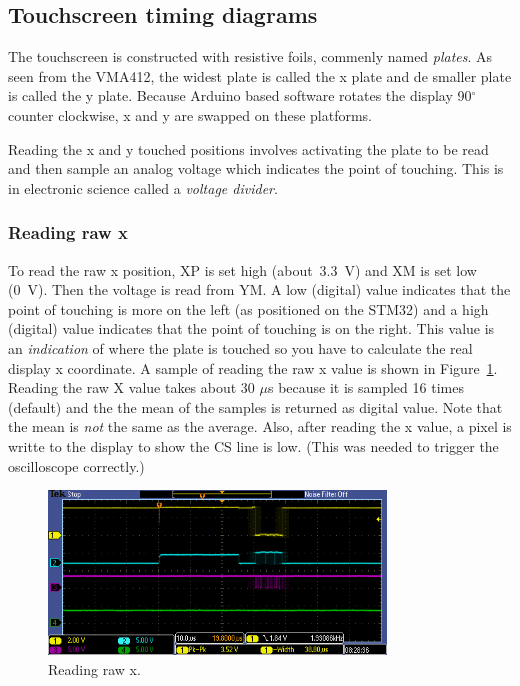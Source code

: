 \documentclass[12pt]{article}
\begin{document}
\subsection{Touchscreen timing diagrams}
The touchscreen is constructed with resistive foils, commenly named \textsl{plates}. As seen from the VMA412, the widest plate is called the x plate and de smaller plate is called the y plate. Because Arduino based software rotates the display 90$^\circ$ counter clockwise, x and y are swapped on these platforms.

Reading the x and y touched positions involves activating the plate to be read and then sample an analog voltage which indicates the point of touching. This is in electronic science called a \textsl{voltage divider}.

\subsubsection{Reading raw x}
To read the raw x position, XP is set high (about~3.3~V) and XM is set low (0~V). Then the voltage is read from YM. A low (digital) value indicates that the point of touching is more on the left (as positioned on the STM32) and a high (digital) value indicates that the point of touching is on the right. This value is an \textsl{indication} of where the plate is touched so you have to calculate the real display x coordinate. A sample of reading the raw x value is shown in Figure~\ref{fig:21}. Reading the raw X value takes about 30 $\mu$s because it is sampled 16 times (default) and the the mean of the samples is returned as digital value. Note that the mean is \textsl{not} the same as the average. Also, after reading the x value, a pixel is writte to the display to show the CS line is low. (This was needed to trigger the oscilloscope correctly.)

\begin{figure}[!ht]
\centering
\includegraphics[width=0.8\textwidth]{sample_x}
\caption{Reading raw x.}
\label{fig:21}
\end{figure}
\end{document}
